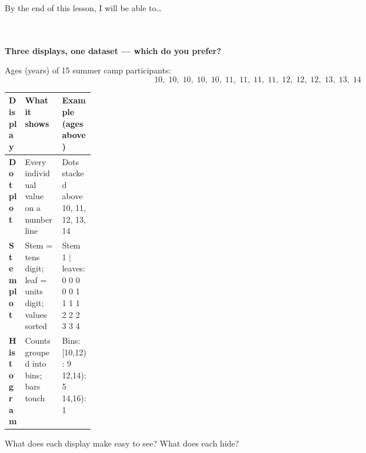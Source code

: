 \documentclass[10pt]{article}
\begin{document}
\namedateperiod

\vspace{0.12in}

\begin{objectivebox}
\small By the end of this lesson, I will be able to\dots\\[4pt]
\writeline\\[1pt]
\writeline\\[1pt]
\writeline
\end{objectivebox}

\vspace{0.1in}

\begin{vocabbox}
\begin{multicols}{2}
\columnbreak
{}
\end{multicols}
\end{vocabbox}

\vspace{0.1in}

\begin{hookbox}
\small\textbf{Three displays, one dataset --- which do you prefer?}

\vspace{6pt}
Ages (years) of 15 summer camp participants:
\[10,\;10,\;10,\;10,\;10,\;11,\;11,\;11,\;11,\;12,\;12,\;12,\;13,\;13,\;14\]

\vspace{4pt}
\renewcommand{\arraystretch}{1.3}
\begin{tabularx}{\linewidth}{@{} >{\bfseries}p{0.17\linewidth}
                                   X X @{}}
\rowcolor{sky}
\textbf{Display} & \textbf{What it shows} & \textbf{Example (ages above)} \\
\midrule
Dotplot   & Every individual value on a number line
          & Dots stacked above 10, 11, 12, 13, 14 \\
Stemplot  & Stem = tens digit; leaf = units digit; values sorted
          & Stem 1 $|$ leaves: 0 0 0 0 0 1 1 1 1 2 2 2 3 3 4 \\
Histogram & Counts grouped into bins; bars touch
          & Bins: {[}10,12{)}: 9 \quad {[}12,14{)}: 5 \quad {[}14,16{)}: 1 \\
\end{tabularx}

\vspace{8pt}
What does each display make easy to see? What does each hide? \blank{5cm}
\end{hookbox}
\end{document}
